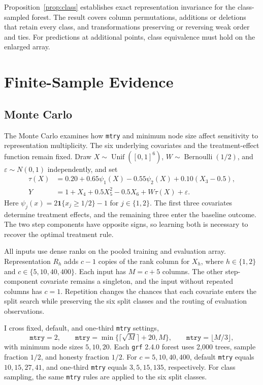 \documentclass[12pt]{article}
\newcommand{\one}{\mathbf 1}
\begin{document}
Proposition~\ref{prop:class} establishes exact representation invariance for the class-sampled forest. The result covers column permutations, additions or deletions that retain every class, and transformations preserving or reversing weak order and ties. For predictions at additional points, class equivalence must hold on the enlarged array.

\section{Finite-Sample Evidence}\label{sec:evidence}

\subsection{Monte Carlo}

The Monte Carlo examines how \texttt{mtry} and minimum node size affect sensitivity to representation multiplicity. The six underlying covariates and the treatment-effect function remain fixed. Draw \(X\sim\operatorname{Unif}([0,1]^6)\), \(W\sim\operatorname{Bernoulli}(1/2)\), and \(\varepsilon\sim N(0,1)\) independently, and set
\begin{align*}
\tau(X)&=0.20+0.65\psi_1(X)-0.55\psi_2(X)+0.10(X_3-0.5),\\
Y&=1+X_4+0.5X_5^2-0.5X_6+W\tau(X)+\varepsilon.
\end{align*}
Here \(\psi_j(x)=2\one\{x_j\ge1/2\}-1\) for \(j\in\{1,2\}\). The first three covariates determine treatment effects, and the remaining three enter the baseline outcome. The two step components have opposite signs, so learning both is necessary to recover the optimal treatment rule.

All inputs use dense ranks on the pooled training and evaluation array. Representation \(R_h\) adds \(c-1\) copies of the rank column for \(X_h\), where \(h\in\{1,2\}\) and \(c\in\{5,10,40,400\}\). Each input has \(M=c+5\) columns. The other step-component covariate remains a singleton, and the input without repeated columns has \(c=1\). Repetition changes the chances that each covariate enters the split search while preserving the six split classes and the routing of evaluation observations.

I cross fixed, default, and one-third \texttt{mtry} settings,
\[
\texttt{mtry}=2,\qquad
\texttt{mtry}=\min\{\lceil\sqrt M\rceil+20,M\},\qquad
\texttt{mtry}=\lfloor M/3\rfloor,
\]
with minimum node sizes \(5,10,20\). Each \texttt{grf} 2.4.0 forest uses 2,000 trees, sample fraction \(1/2\), and honesty fraction \(1/2\). For \(c=5,10,40,400\), default \texttt{mtry} equals \(10,15,27,41\), and one-third \texttt{mtry} equals \(3,5,15,135\), respectively. For class sampling, the same \texttt{mtry} rules are applied to the six split classes.
\end{document}
